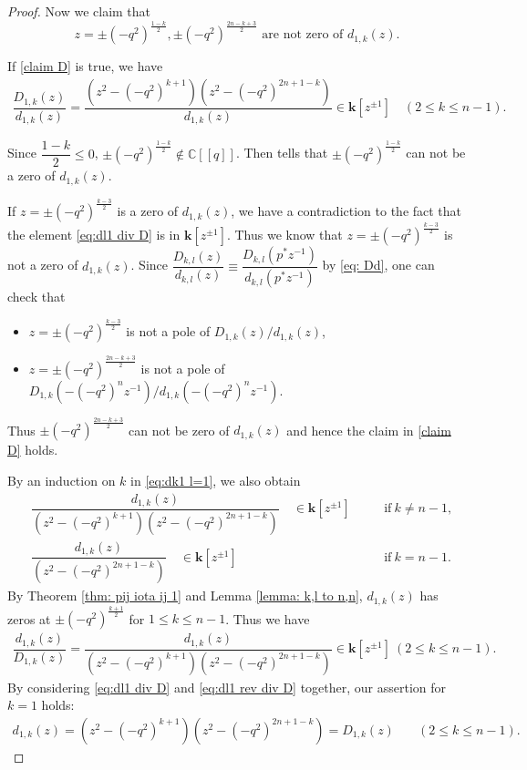 \documentclass[11pt, leqno]{amsart}
\theoremstyle{definition}
\numberwithin{equation}{section}
\begin{document}
\begin{proof}
Now we claim that
\begin{equation} \label{claim D}
\text{$z=\pm{(-q^2)}^{\frac{1-k}{2}},\pm{(-q^2)}^{\frac{2n-k+3}{2}}$ are not zero of $d_{1,k}(z)$.}
\end{equation}

If \eqref{claim D} is true, we have
\begin{align} \label{eq:dl1 div D}
\dfrac{D_{1,k}(z)}{d_{1,k}(z)}=\dfrac{(z^2-{(-q^2)}^{k+1})(z^2-{(-q^2)}^{2n+1-k})}{d_{1,k}(z)}
    \in {\mathbf{k}}[z^{\pm 1}]\quad (2 \le k \le n-1).
\end{align}

Since $\dfrac{1-k}{2} \le 0$, $\pm{(-q^2)}^{\frac{1-k}{2}}\not\in {\mathbb C}[[q]]$. Then \cite[Theorem 2.2.1 (i)]{KKK13b} tells that
$\pm{(-q^2)}^{\frac{1-k}{2}}$ can not be a zero of $d_{1,k}(z)$.

If  $z=\pm{(-q^2)}^{\frac{k-3}{2}}$ is a zero of $d_{1,k}(z)$, we have a contradiction to the fact that the element \eqref{eq:dl1 div D}
is in ${\mathbf{k}}[z^{\pm 1}]$. Thus we know that $z=\pm{(-q^2)}^{\frac{k-3}{2}}$ is not a zero of
$d_{1,k}(z)$. Since $\dfrac{{D_{k,l}}(z)}{d_{k,l}(z)}  \equiv \dfrac{{D_{k,l}}(p^*z^{-1})}{d_{k,l}(p^*z^{-1})}$ by \eqref{eq: Dd},
one can check that
\begin{itemize}
\item $z=\pm{(-q^2)}^{\frac{k-3}{2}}$ is not a pole of $D_{1,k}(z)/d_{1,k}(z)$,
\item $z=\pm{(-q^2)}^{\frac{2n-k+3}{2}}$ is not a pole of $D_{1,k}(-{(-q^2)}^{n}z^{-1})/
d_{1,k}(-{(-q^2)}^{n}z^{-1})$.
\end{itemize}
Thus $\pm{(-q^2)}^{\frac{2n-k+3}{2}}$ can not be zero of $d_{1,k}(z)$ and hence the claim in \eqref{claim D} holds.

By an induction on $k$ in
\eqref{eq:dk1 l=1},
we also obtain
\begin{align*}
  &\dfrac{d_{1,k}(z)}{(z^2-{(-q^2)}^{k+1})(z^2-{(-q^2)}^{2n+1-k})}
  \quad \in {\mathbf{k}}[z^{\pm 1}]  &&\quad \text{if} \ k \neq n-1, \\
&\dfrac{d_{1,k}(z)}{(z^2-{(-q^2)}^{2n+1-k})}
  \quad \in {\mathbf{k}}[z^{\pm 1}]  &&\quad \text{if} \ k = n-1.
\end{align*}
By Theorem \ref{thm: pij iota ij 1} and Lemma
\ref{lemma: k,l to n,n}, $d_{1,k}(z)$ has zeros at $\pm{(-q^2)}^{\frac{k+1}{2}}$
for $1 \le k \le n-1$.
Thus we have \begin{align} \label{eq:dl1 rev div D}
\dfrac{d_{1,k}(z)}{D_{1,k}(z)}=\dfrac{d_{1,k}(z)}{(z^2-{(-q^2)}^{k+1})(z^2-{(-q^2)}^{2n+1-k})}
\in {\mathbf{k}}[z^{\pm 1}]  \  (2\leq k \le n-1). \end{align}
By considering \eqref{eq:dl1 div D} and \eqref{eq:dl1 rev div D} together, our assertion for $k=1$ holds:
\begin{align*}
d_{1,k}(z)=
(z^2-{(-q^2)}^{k+1})(z^2-{(-q^2)}^{2n+1-k})=D_{1,k}(z)
&\quad  (2 \le k \le n-1).
\end{align*}


\end{proof}
\end{document}
